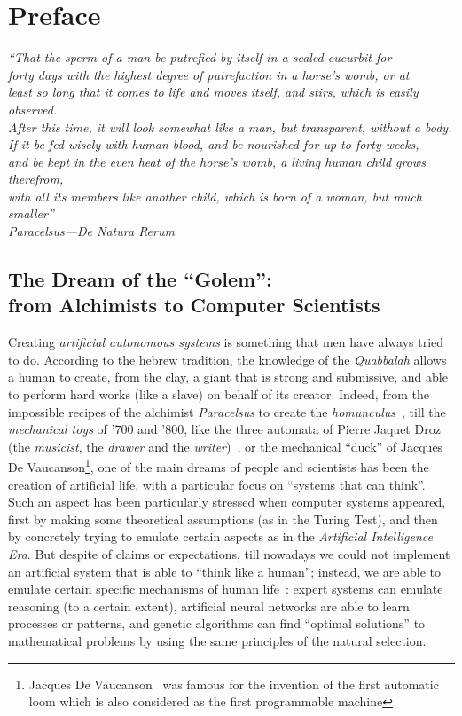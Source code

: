 \chapter{Preface}
{\raggedleft{}\em%
``That the sperm of a man be putrefied by itself in a sealed cucurbit for\\
forty days with the highest degree of putrefaction in a horse's womb, or at\\
least so long that it comes to life and moves itself, and stirs, which is
easily observed.\\
After this time, it will look somewhat like a man, but
transparent, without a body.\\
If it be fed wisely with
human blood, and be nourished for up to forty weeks,\\
and be kept
in the even heat of the horse's womb, a living human child grows therefrom,\\
with all its members like another child, which is born of a woman, but much
smaller''\\
Paracelsus---De Natura Rerum~\cite{homunculus}\\}
\section{The Dream of the ``Golem'':\\from Alchimists to Computer Scientists}
Creating \emph{artificial autonomous systems} is something that men have
always tried to do.
According to the hebrew tradition, the knowledge of the \emph{Quabbalah}
allows a human to create, from the clay, a giant that is strong and
submissive, and able to perform hard works (like a slave) on behalf of its
creator.
Indeed, from the impossible recipes of the alchimist \emph{Paracelsus} to create
the \emph{homunculus}~\cite{homunculus}, till the \emph{mechanical toys} of
'700 and '800, like the three automata of Pierre Jaquet Droz (the
\emph{musicist}, the \emph{drawer} and the
\emph{writer})~\cite{jaquet-droz}, or the
mechanical ``duck'' of Jacques De
Vaucanson\footnote{Jacques De Vaucanson~\cite{de-vaucaunson} was famous for
  the invention of the
  first automatic loom which is also considered as the first programmable
  machine},
one of the main
dreams of people and
scientists has been the creation of artificial life, with a particular
focus on ``systems that can think''.
Such an aspect has been particularly stressed when computer systems
appeared, first by making some theoretical assumptions (as in the Turing
Test), and then by concretely trying to emulate certain aspects as in the
\emph{Artificial Intelligence Era}.
But despite of claims or expectations, till nowadays we could not
implement an
artificial system that is able to ``think like a human''; instead, we are able
to emulate certain specific mechanisms of human life~\cite{RusselNorvig}:
expert systems can emulate reasoning (to a certain extent), artificial neural
networks are able to learn
processes or patterns, and genetic algorithms can find ``optimal
solutions'' to mathematical problems by using the same principles of the
natural selection.


